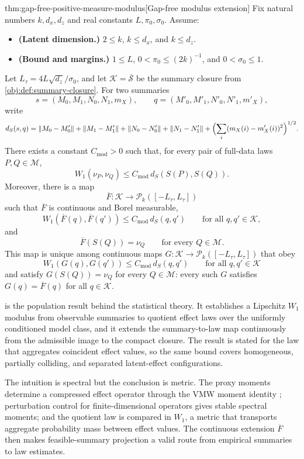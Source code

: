 \begin{theoremv}{thm:gap-free-positive-measure-modulus}[Gap-free modulus extension]
Fix natural numbers \(k,d_x,d_z\) and real constants \(L,\pi_0,\sigma_0\).  Assume:
\begin{itemize}
\item \textbf{(Latent dimension.)} \(2\le k\), \(k\le d_x\), and \(k\le d_z\).
\item \textbf{(Bound and margins.)} \(1\le L\), \(0<\pi_0\le (2k)^{-1}\), and \(0<\sigma_0\le 1\).
\end{itemize}
Let \(L_\tau=4L\sqrt{d_z}/\sigma_0\), and let \(\mathcal K=\overline{\mathscr S}\) be the summary closure from \cref{obj:def:summary-closure}.  For two summaries
\[
s=(M_0,M_1,N_0,N_1,m_X),
\qquad
q=(M'_0,M'_1,N'_0,N'_1,m'_X),
\]
write
\[
d_S(s,q)
=
\|M_0-M'_0\|+\|M_1-M'_1\|
+\|N_0-N'_0\|+\|N_1-N'_1\|
+\Bigl(\sum_i (m_X(i)-m'_X(i))^2\Bigr)^{1/2}.
\]
There exists a constant \(C_{\mathrm{mod}}>0\) such that, for every pair of full-data laws \(P,Q\in\mathcal M\),
\[
W_1(\nu_P,\nu_Q)\le C_{\mathrm{mod}}\,d_S(S(P),S(Q)).
\]
Moreover, there is a map
\[
\overline F:\mathcal K\to \mathcal P_k([-L_\tau,L_\tau])
\]
such that \(\overline F\) is continuous and Borel measurable,
\[
W_1(\overline F(q),\overline F(q'))
\le C_{\mathrm{mod}}\,d_S(q,q')
\qquad\text{for all }q,q'\in\mathcal K,
\]
and
\[
\overline F(S(Q))=\nu_Q
\qquad\text{for every }Q\in\mathcal M.
\]
This map is unique among continuous maps \(G:\mathcal K\to\mathcal P_k([-L_\tau,L_\tau])\) that obey
\[
W_1(G(q),G(q'))
\le C_{\mathrm{mod}}\,d_S(q,q')
\qquad\text{for all }q,q'\in\mathcal K
\]
and satisfy \(G(S(Q))=\nu_Q\) for every \(Q\in\mathcal M\): every such \(G\) satisfies \(G(q)=\overline F(q)\) for all \(q\in\mathcal K\).
\end{theoremv}

 is the population result behind the statistical theory. It establishes a Lipschitz \(W_1\) modulus from observable summaries to quotient effect laws over the uniformly conditioned model class, and it extends the summary-to-law map continuously from the admissible image to the compact closure. The result is stated for the law that aggregates coincident effect values, so the same bound covers homogeneous, partially colliding, and separated latent-effect configurations.

The intuition is spectral but the conclusion is metric. The proxy moments determine a compressed effect operator through the VMW moment identity \citep{VirkMazaheriWu2026}; perturbation control for finite-dimensional operators \citep{BauerFike1960,Kato1995} gives stable spectral moments; and the quotient law is compared in \(W_1\), a metric that transports aggregate probability mass between effect values. The continuous extension \(\overline F\) then makes feasible-summary projection a valid route from empirical summaries to law estimates.

